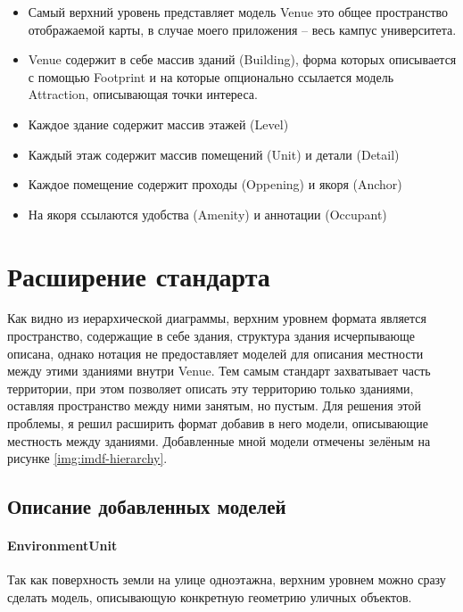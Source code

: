       \begin{itemize}
        \item Самый верхний уровень представляет модель Venue это общее пространство отображаемой карты, в случае моего приложения -- весь кампус университета.
        \item Venue содержит в себе массив зданий (Building), форма которых описывается с помощью Footprint и на которые опционально ссылается модель Attraction, описывающая точки интереса.
        \item Каждое здание содержит массив этажей (Level)
        \item Каждый этаж содержит массив помещений (Unit) и детали (Detail)
        \item Каждое помещение содержит проходы (Oppening) и якоря (Anchor)
        \item На якоря ссылаются удобства (Amenity) и аннотации (Occupant)
      \end{itemize}

  \section{Расширение стандарта}
    Как видно из иерархической диаграммы, верхним уровнем формата является пространство, содержащие в себе здания, структура здания исчерпывающе описана, однако нотация не предоставляет моделей для описания местности между этими зданиями внутри Venue. Тем самым стандарт захватывает часть территории, при этом позволяет описать эту территорию только зданиями, оставляя пространство между ними занятым, но пустым.
    Для решения этой проблемы, я решил расширить формат добавив в него модели, описывающие местность между зданиями. Добавленные мной модели отмечены зелёным на рисунке \ref{img:imdf-hierarchy}.

    \subsection{Описание добавленных моделей}
      \paragraph{EnvironmentUnit}
        Так как поверхность земли на улице одноэтажна, верхним уровнем можно сразу сделать модель, описывающую конкретную геометрию уличных объектов.

